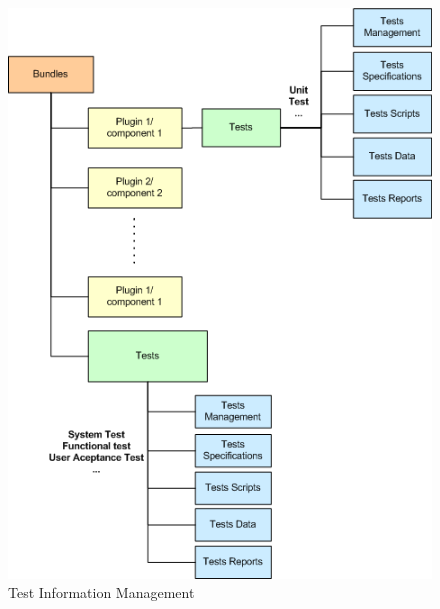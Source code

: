 \begin{figure}[H]
\includegraphics[width=\textwidth]{test_info_management}
\caption{\label{fig:testmanag} Test Information Management} 
\end{figure}

